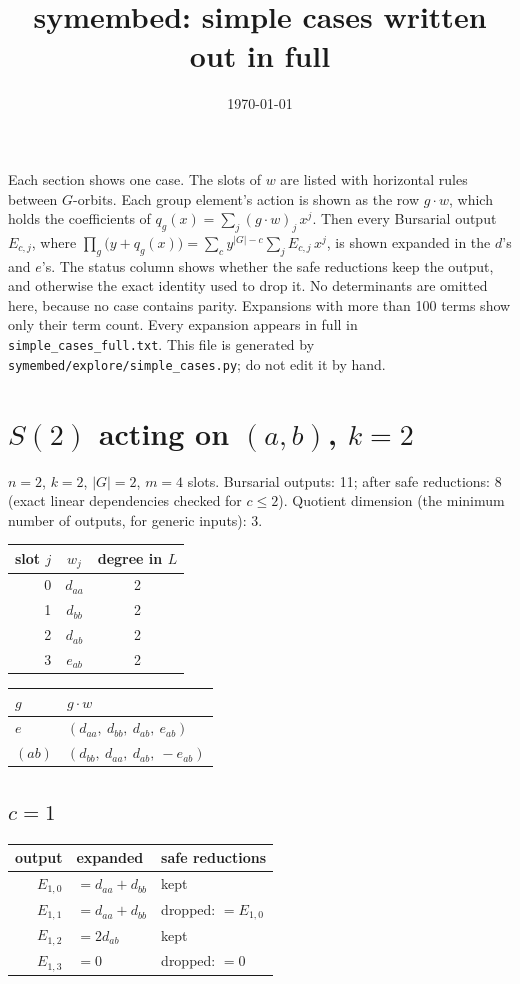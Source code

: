 \documentclass[10pt]{article}
\title{symembed: simple cases written out in full}
\date{\today}
\begin{document}
\maketitle

Each section shows one case. The slots of $w$ are listed with horizontal rules between $G$-orbits. Each group
element's action is shown as the row $g \cdot w$, which holds the coefficients of
$q_g(x) = \sum_j (g\cdot w)_j\, x^j$. Then every Bursarial output $E_{c,j}$, where
$\prod_g \bigl(y + q_g(x)\bigr) = \sum_c y^{|G| - c} \sum_j E_{c,j}\, x^j$, is shown expanded in the $d$'s and
$e$'s. The status column shows whether the safe reductions keep the output, and otherwise the exact identity used
to drop it. No determinants are omitted here, because no case contains parity. Expansions with more than
100 terms show only their term count. Every expansion appears in full in \texttt{simple\_cases\_full.txt}.
This file is generated by \texttt{symembed/explore/simple\_cases.py}; do not edit it by hand.

\section{$S(2)$ acting on $(a, b)$, $k = 2$}
$n = 2$, $k = 2$, $|G| = 2$, $m = 4$ slots. Bursarial outputs: 11; after safe reductions: 8 (exact linear dependencies checked for $c \le 2$). Quotient dimension (the minimum number of outputs, for generic inputs): 3.

\begin{longtable}{rcc}
slot $j$ & $w_j$ & degree in $L$ \\ \hline
0 & $d_{aa}$ & 2 \\
1 & $d_{bb}$ & 2 \\ \hline
2 & $d_{ab}$ & 2 \\ \hline
3 & $e_{ab}$ & 2 \\ \hline
\end{longtable}

\begin{longtable}{ll}
$g$ & $g \cdot w$ \\ \hline
$e$ & $(d_{aa},\ d_{bb},\ d_{ab},\ e_{ab})$ \\
$(a b)$ & $(d_{bb},\ d_{aa},\ d_{ab},\ -e_{ab})$ \\
\end{longtable}

\subsection*{$c = 1$}
\begin{longtable}{r>{\raggedright\arraybackslash}p{}>{\raggedright\arraybackslash}p{}}
output & expanded & safe reductions \\ \hline
$E_{1,0}$ & $= d_{aa} + d_{bb}$ & kept \\
$E_{1,1}$ & $= d_{aa} + d_{bb}$ & dropped: $= E_{1,0}$ \\
$E_{1,2}$ & $= 2 d_{ab}$ & kept \\
$E_{1,3}$ & $= 0$ & dropped: $= 0$ \\
\end{longtable}
\end{document}
